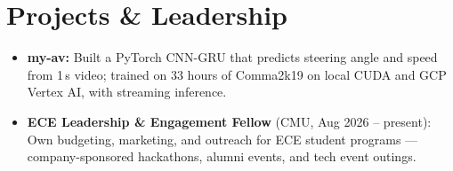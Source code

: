 \documentclass[11pt, letterpaper]{article}
\begin{document}
\section{Projects \& Leadership}
\begin{itemize}
  \item \textbf{my-av:} Built a PyTorch CNN-GRU that predicts steering angle and speed from 1\,s video; trained on 33 hours of Comma2k19 on local CUDA and GCP Vertex AI, with streaming inference.
  \item \textbf{ECE Leadership \& Engagement Fellow} (CMU, Aug 2026 -- present): Own budgeting, marketing, and outreach for ECE student programs --- company-sponsored hackathons, alumni events, and tech event outings.
\end{itemize}
\end{document}
